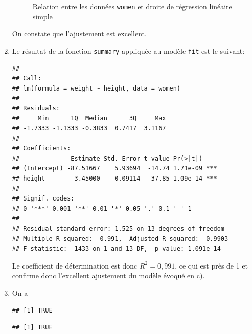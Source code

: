 \begin{solution}{2.3}
\begin{enumerate}
\begin{figure}
\begin{knitrout}
\end{knitrout}
        \caption{Relation entre les données \texttt{women} et droite de régression linéaire simple}
        \label{fig:simple:women2}
      \end{figure}
      On constate que l'ajustement est excellent.
    \item Le résultat de la fonction \texttt{summary} appliquée au
      modèle \texttt{fit} est le suivant:
\begin{knitrout}
\color{fgcolor}\begin{kframe}
\begin{alltt}
\end{alltt}
\begin{verbatim}
##
## Call:
## lm(formula = weight ~ height, data = women)
##
## Residuals:
##     Min      1Q  Median      3Q     Max
## -1.7333 -1.1333 -0.3833  0.7417  3.1167
##
## Coefficients:
##              Estimate Std. Error t value Pr(>|t|)
## (Intercept) -87.51667    5.93694  -14.74 1.71e-09 ***
## height        3.45000    0.09114   37.85 1.09e-14 ***
## ---
## Signif. codes:
## 0 '***' 0.001 '**' 0.01 '*' 0.05 '.' 0.1 ' ' 1
##
## Residual standard error: 1.525 on 13 degrees of freedom
## Multiple R-squared:  0.991,	Adjusted R-squared:  0.9903
## F-statistic:  1433 on 1 and 13 DF,  p-value: 1.091e-14
\end{verbatim}
\end{kframe}
\end{knitrout}
      Le coefficient de détermination est donc
      $R^2 = 0,991$, %
      ce qui est près de 1 et confirme donc l'excellent
      ajustement du modèle évoqué en c).
    \item On a
\begin{knitrout}
\color{fgcolor}\begin{kframe}
\begin{alltt}
 \hlkwb{<-}  \hlopt{-} \hlopt{^}\hlstd{)}
 \hlkwb{<-} \hlstd{((} \hlopt{-} \hlopt{^}\hlstd{)}
 \hlkwb{<-}  \hlopt{-} \hlopt{^}\hlstd{)}
 \hlopt{+} 
\end{alltt}
\begin{verbatim}
## [1] TRUE
\end{verbatim}
\begin{alltt}
\hlstd{(}\hlopt{$}\hlopt{/}
\end{alltt}
\begin{verbatim}
## [1] TRUE
\end{verbatim}
\end{kframe}
\end{knitrout}
    \end{enumerate}
  
\end{solution}
